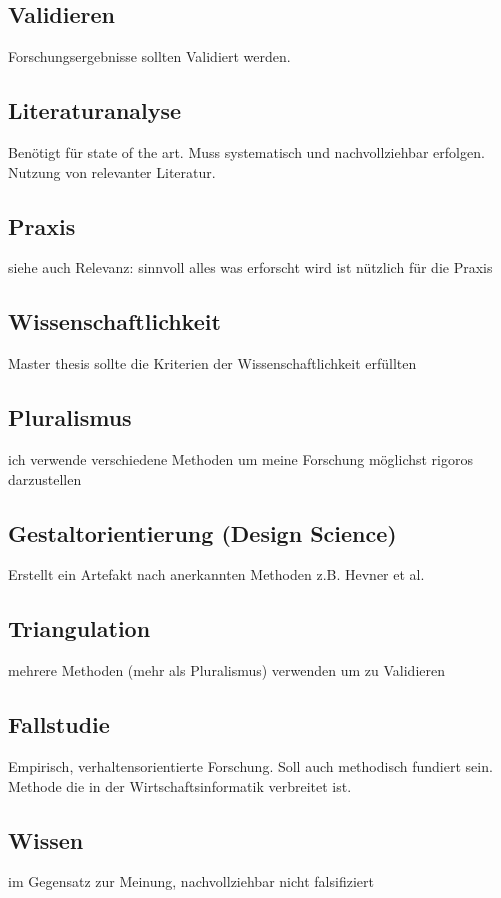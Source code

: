\documentclass[DIV=calc, paper=a4, fontsize=11pt, twocolumn]{scrartcl}	 %
\begin{document}
\subsection*{Validieren}
Forschungsergebnisse sollten Validiert werden.

\subsection*{Literaturanalyse}
Ben\"otigt f\"ur state of the art. Muss systematisch und nachvollziehbar erfolgen. Nutzung von relevanter Literatur.

\subsection*{Praxis}
siehe auch Relevanz: sinnvoll alles was erforscht wird ist n\"utzlich f\"ur die Praxis

\subsection*{Wissenschaftlichkeit}
Master thesis sollte die Kriterien der Wissenschaftlichkeit erf\"ullten

\subsection*{Pluralismus}
ich verwende verschiedene Methoden um meine Forschung m\"oglichst rigoros darzustellen

\subsection*{Gestaltorientierung (Design Science)}
Erstellt ein Artefakt nach anerkannten Methoden z.B. Hevner et al.
\subsection*{Triangulation}
mehrere Methoden (mehr als Pluralismus) verwenden um zu Validieren

\subsection*{Fallstudie}
Empirisch, verhaltensorientierte Forschung. Soll auch methodisch fundiert sein. Methode die in der Wirtschaftsinformatik verbreitet ist.

\subsection*{Wissen}
im Gegensatz zur Meinung, nachvollziehbar nicht falsifiziert
\end{document}

